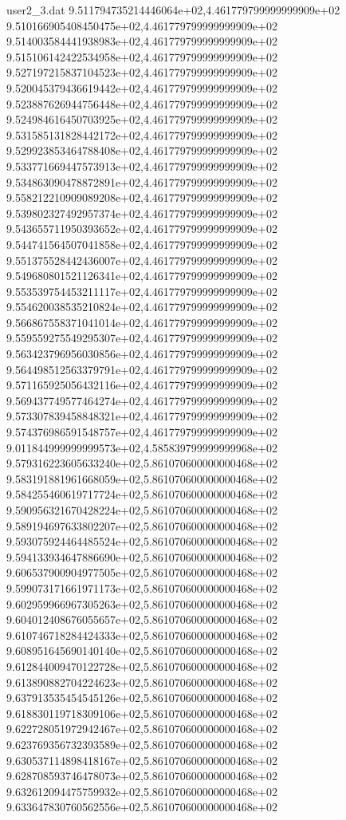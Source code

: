 \begin{filecontents}{user2_3.dat}
9.511794735214446064e+02,4.461779799999999909e+02
9.510166905408450475e+02,4.461779799999999909e+02
9.514003584441938983e+02,4.461779799999999909e+02
9.515106142422534958e+02,4.461779799999999909e+02
9.527197215837104523e+02,4.461779799999999909e+02
9.520045379436619442e+02,4.461779799999999909e+02
9.523887626944756448e+02,4.461779799999999909e+02
9.524984616450703925e+02,4.461779799999999909e+02
9.531585131828442172e+02,4.461779799999999909e+02
9.529923853464788408e+02,4.461779799999999909e+02
9.533771669447573913e+02,4.461779799999999909e+02
9.534863090478872891e+02,4.461779799999999909e+02
9.558212210909089208e+02,4.461779799999999909e+02
9.539802327492957374e+02,4.461779799999999909e+02
9.543655711950393652e+02,4.461779799999999909e+02
9.544741564507041858e+02,4.461779799999999909e+02
9.551375528442436007e+02,4.461779799999999909e+02
9.549680801521126341e+02,4.461779799999999909e+02
9.553539754453211117e+02,4.461779799999999909e+02
9.554620038535210824e+02,4.461779799999999909e+02
9.566867558371041014e+02,4.461779799999999909e+02
9.559559275549295307e+02,4.461779799999999909e+02
9.563423796956030856e+02,4.461779799999999909e+02
9.564498512563379791e+02,4.461779799999999909e+02
9.571165925056432116e+02,4.461779799999999909e+02
9.569437749577464274e+02,4.461779799999999909e+02
9.573307839458848321e+02,4.461779799999999909e+02
9.574376986591548757e+02,4.461779799999999909e+02
9.011844999999999573e+02,4.585839799999999968e+02
9.579316223605633240e+02,5.861070600000000468e+02
9.583191881961668059e+02,5.861070600000000468e+02
9.584255460619717724e+02,5.861070600000000468e+02
9.590956321670428224e+02,5.861070600000000468e+02
9.589194697633802207e+02,5.861070600000000468e+02
9.593075924464485524e+02,5.861070600000000468e+02
9.594133934647886690e+02,5.861070600000000468e+02
9.606537900904977505e+02,5.861070600000000468e+02
9.599073171661971173e+02,5.861070600000000468e+02
9.602959966967305263e+02,5.861070600000000468e+02
9.604012408676055657e+02,5.861070600000000468e+02
9.610746718284424333e+02,5.861070600000000468e+02
9.608951645690140140e+02,5.861070600000000468e+02
9.612844009470122728e+02,5.861070600000000468e+02
9.613890882704224623e+02,5.861070600000000468e+02
9.637913535454545126e+02,5.861070600000000468e+02
9.618830119718309106e+02,5.861070600000000468e+02
9.622728051972942467e+02,5.861070600000000468e+02
9.623769356732393589e+02,5.861070600000000468e+02
9.630537114898418167e+02,5.861070600000000468e+02
9.628708593746478073e+02,5.861070600000000468e+02
9.632612094475759932e+02,5.861070600000000468e+02
9.633647830760562556e+02,5.861070600000000468e+02

\end{filecontents}
